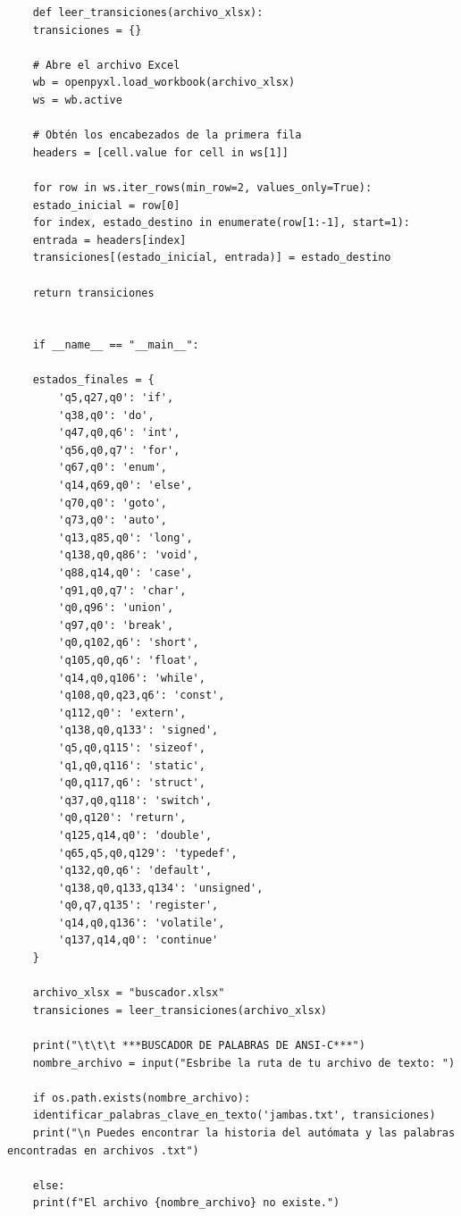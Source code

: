 \documentclass[11pt]{article} %
\begin{document}
\begin{lstlisting}
	def leer_transiciones(archivo_xlsx):
	transiciones = {}
	
	# Abre el archivo Excel
	wb = openpyxl.load_workbook(archivo_xlsx)
	ws = wb.active
	
	# Obtén los encabezados de la primera fila
	headers = [cell.value for cell in ws[1]]
	
	for row in ws.iter_rows(min_row=2, values_only=True):
	estado_inicial = row[0]
	for index, estado_destino in enumerate(row[1:-1], start=1):
	entrada = headers[index]
	transiciones[(estado_inicial, entrada)] = estado_destino
	
	return transiciones
	
	
	if __name__ == "__main__":
	
	estados_finales = {
		'q5,q27,q0': 'if',
		'q38,q0': 'do',
		'q47,q0,q6': 'int',
		'q56,q0,q7': 'for',
		'q67,q0': 'enum',
		'q14,q69,q0': 'else',
		'q70,q0': 'goto',
		'q73,q0': 'auto',
		'q13,q85,q0': 'long',
		'q138,q0,q86': 'void',
		'q88,q14,q0': 'case',
		'q91,q0,q7': 'char',
		'q0,q96': 'union',
		'q97,q0': 'break',
		'q0,q102,q6': 'short',
		'q105,q0,q6': 'float',
		'q14,q0,q106': 'while',
		'q108,q0,q23,q6': 'const',
		'q112,q0': 'extern',
		'q138,q0,q133': 'signed',
		'q5,q0,q115': 'sizeof',
		'q1,q0,q116': 'static',
		'q0,q117,q6': 'struct',
		'q37,q0,q118': 'switch',
		'q0,q120': 'return',
		'q125,q14,q0': 'double',
		'q65,q5,q0,q129': 'typedef',
		'q132,q0,q6': 'default',
		'q138,q0,q133,q134': 'unsigned',
		'q0,q7,q135': 'register',
		'q14,q0,q136': 'volatile',
		'q137,q14,q0': 'continue'
	}
	
	archivo_xlsx = "buscador.xlsx"
	transiciones = leer_transiciones(archivo_xlsx)
	
	print("\t\t\t ***BUSCADOR DE PALABRAS DE ANSI-C***")
	nombre_archivo = input("Esbribe la ruta de tu archivo de texto: ")
	
	if os.path.exists(nombre_archivo):
	identificar_palabras_clave_en_texto('jambas.txt', transiciones)
	print("\n Puedes encontrar la historia del autómata y las palabras encontradas en archivos .txt")
	
	else:
	print(f"El archivo {nombre_archivo} no existe.")
	
	
	\end{lstlisting}

	
	
\end{document}
